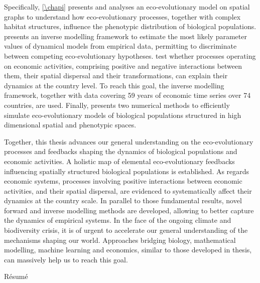 {Specifically, \cref{\chapi} presents and analyses an eco-evolutionary model on spatial graphs to understand how eco-evolutionary processes, together with complex habitat structures, influence the phenotypic distribution of biological populations. \Cref{\chapii} presents an inverse modelling framework to estimate the most likely parameter values of dynamical models from empirical data, permitting to discriminate between competing eco-evolutionary hypotheses. \Cref{\chapiv} test whether processes operating on economic activities, comprising positive and negative interactions between them, their spatial dispersal and their transformations, can explain their dynamics at the country level. To reach this goal, the inverse modelling framework, together with data covering 59 years of economic time series over 74 countries, are used. Finally, \Cref{\chapiv} presents two numerical methods to efficiently simulate eco-evolutionary models of biological populations structured in high dimensional spatial and phenotypic spaces.

Together, this thesis advances our general understanding on the eco-evolutionary processes and feedbacks shaping the dynamics of biological populations and economic activities. A holistic map of elemental eco-evolutionary feedbacks influencing spatially structured biological populations is established. As regards economic systems, processes involving positive interactions between economic activities, and their spatial dispersal, are evidenced to systematically affect their dynamics at the country scale.
% 
In parallel to those fundamental results, novel forward and inverse modelling methods are developed, allowing to better capture the dynamics of empirical systems.
% 
In the face of the ongoing climate and biodiversity crisis, it is of urgent to accelerate our general understanding of the mechanisms shaping our world.
% 
Approaches bridging biology, mathematical modelling, machine learning and economics, similar to those developed in thesis, can massively help us to reach this goal.
}

\vspace*{20mm}

{Résumé}
\label{sec:summary-fr}
\vspace*{15mm}

